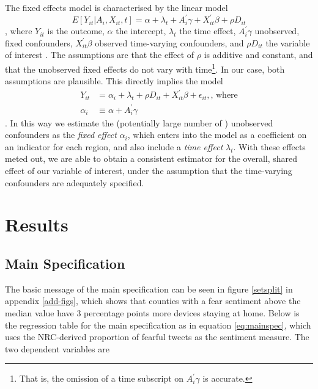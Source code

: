 \documentclass{article}
\begin{document}
The fixed effects model is characterised by the linear model  
\begin{equation}
  E[Y_{it} | A_i , X_{it}, t] = \alpha + \lambda_t + A^\prime_i \gamma + X^\prime_{it} \beta + \rho D_{it}
\end{equation}
, where \(Y_{it}\) is the outcome, \(\alpha\) the intercept, \(\lambda_t\) the time effect, \(A^\prime_i \gamma\) unobserved, fixed confounders, \(X^\prime_{it} \beta\) observed time-varying confounders, and \(\rho D_{it}\) the variable of interest \parencite[222]{angristMostlyHarmlessEconometrics2009}. The assumptions are that the effect of \(\rho\) is additive and constant, and that the unobserved fixed effects do not vary with time\footnote{That is, the omission of a time subscript on \(A^\prime_i \gamma\) is accurate.}. In our case, both assumptions are plausible. This directly implies the model 
\begin{align}
  Y_{it} &= \alpha_i + \lambda_t + \rho D_{it} + X^\prime_{it} \beta + \epsilon_{it}, \textrm{, where} \\
  \alpha_i &\equiv \alpha + A_i^\prime \gamma
\end{align}. In this way we estimate the (potentially large number of ) unobserved confounders as the \textit{fixed effect} \(\alpha_i\), which enters into the model as a coefficient on an indicator for each region, and also include a \textit{time effect} \(\lambda_t\). With these effects meted out, we are able to obtain a consistent estimator for the overall, shared effect of our variable of interest, under the assumption that the time-varying confounders are adequately specified. %



\section{Results}%
\subsection{Main Specification}
The basic message of the main specification can be seen in figure \ref{setsplit} in appendix \ref{add-figs}, which shows that counties with a fear sentiment above the median value have 3 percentage points more devices staying at home. Below is the regression table for the main specification as in equation \ref{eq:mainspec}, which uses the NRC-derived proportion of fearful tweets as the sentiment measure. The two dependent variables are 
\end{document}
